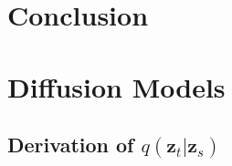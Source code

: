 \documentclass[ oneside,%
                    author={George Herbert},
                    degree={MSci},
                     title={Video Diffusion Models for Climate Simulations},
                  subtitle={}]{dissertation}
\begin{document}
\chapter{Conclusion}
\label{chap:conclusion}


%
%
%

\backmatter





\appendix

\chapter{Diffusion Models}
\label{appx:diffusion}

\section{Derivation of $q(\mathbf{z}_t|\mathbf{z}_s)$}
\label{appx:diffusion_q_z_t_given_z_s}
\end{document}
